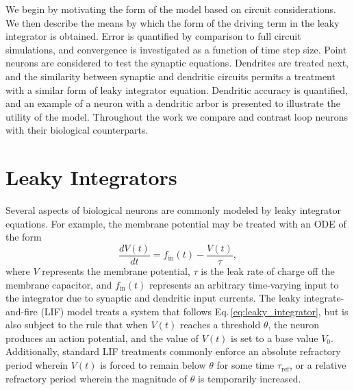 \documentclass[twocolumn]{article}
\begin{document}
We begin by motivating the form of the model based on circuit considerations. We then describe the means by which the form of the driving term in the leaky integrator is obtained. Error is quantified by comparison to full circuit simulations, and convergence is investigated as a function of time step size. Point neurons are considered to test the synaptic equations. Dendrites are treated next, and the similarity between synaptic and dendritic circuits permits a treatment with a similar form of leaky integrator equation. Dendritic accuracy is quantified, and an example of a neuron with a dendritic arbor is presented to illustrate the utility of the model. Throughout the work we compare and contrast loop neurons with their biological counterparts. 

\section{\label{sec:leaky_integrators}Leaky Integrators}
Several aspects of biological neurons are commonly modeled by leaky integrator equations. For example, the membrane potential may be treated with an ODE of the form
\begin{equation}
\label{eq:leaky_integrator}
\frac{dV(t)}{dt} = f_{\mathrm{in}}(t)-\frac{V(t)}{\tau},
\end{equation}
where $V$ represents the membrane potential, $\tau$ is the leak rate of charge off the membrane capacitor, and $f_{\mathrm{in}}(t)$ represents an arbitrary time-varying input to the integrator due to synaptic and dendritic input currents. The leaky integrate-and-fire (LIF) model treats a system that follows Eq.\,\ref{eq:leaky_integrator}, but is also subject to the rule that when $V(t)$ reaches a threshold $\theta$, the neuron produces an action potential, and the value of $V(t)$ is set to a base value $V_0$. Additionally, standard LIF treatments commonly enforce an absolute refractory period wherein $V(t)$ is forced to remain below $\theta$ for some time $\tau_{\mathrm{ref}}$, or a relative refractory period wherein the magnitude of $\theta$ is temporarily increased.
\end{document}
